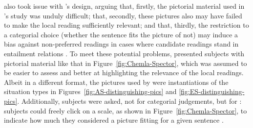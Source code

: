 \documentclass[fleqn,reqno,10pt,draft]{article}
\begin{document}
\citet{ChemlaSpector2010:Experimental-Ev} also took issue with
\citeauthor{GeurtsPouscoulous2009:Embedded-Implic}'s design, arguing
that, firstly, the pictorial material used in
\citeauthor{GeurtsPouscoulous2009:Embedded-Implic}'s study was unduly
difficult; that, secondly, these pictures also may have failed to make
the local reading sufficiently relevant; and that, thirdly, the
restriction to a categorial choice (whether the sentence fits the
picture of not) may induce a bias against non-preferred readings in
cases where candidate readings stand in entailment relations
\citep[c.f.][for this latter
criticism]{Sauerland2010:Embedded-Implic}. To meet these potential
problems, \citet{ChemlaSpector2010:Experimental-Ev} presented subjects
with pictorial material like that in Figure~\ref{fig:Chemla-Spector},
which was assumed to be easier to assess and better at highlighting
the relevance of the local readings. Albeit in a different format, the
pictures used by \citeauthor{ChemlaSpector2010:Experimental-Ev} were
instantiations of the situation types in
Figures~\ref{fig:AS-distinguishing-pics} and
\ref{fig:ES-distinguishing-pics}. Additionally, subjects were asked,
not for categorial judgements, but for :
subjects could freely click on a scale, as shown in
Figure~\ref{fig:Chemla-Spector}, to indicate how much they considered
a picture fitting for a given sentence \citep[c.f.][for more on this
method]{Chemla2009:Presuppositions}. 
\end{document}
